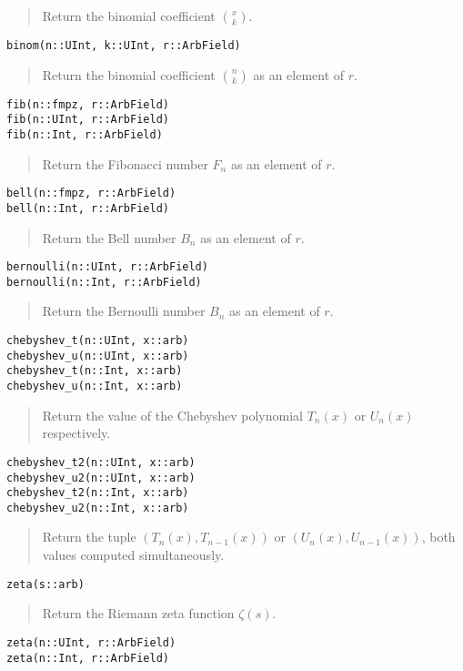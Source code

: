 \documentclass[a4paper,10pt]{article}
\newcommand{\desc}[1]{\vspace{-3mm}\begin{quote}#1\end{quote}}
\begin{document}
{{\desc{Return the binomial coefficient ${x \choose k}$.}

\begin{lstlisting}
binom(n::UInt, k::UInt, r::ArbField)
\end{lstlisting}

\desc{Return the binomial coefficient ${n \choose k}$ as an element of $r$.}

\begin{lstlisting}
fib(n::fmpz, r::ArbField)
fib(n::UInt, r::ArbField)
fib(n::Int, r::ArbField)
\end{lstlisting}

\desc{Return the Fibonacci number $F_n$ as an element of $r$.}

\begin{lstlisting}
bell(n::fmpz, r::ArbField)
bell(n::Int, r::ArbField)
\end{lstlisting}

\desc{Return the Bell number $B_n$ as an element of $r$.}

\begin{lstlisting}
bernoulli(n::UInt, r::ArbField)
bernoulli(n::Int, r::ArbField)
\end{lstlisting}

\desc{Return the Bernoulli number $B_n$ as an element of $r$.}

\begin{lstlisting}
chebyshev_t(n::UInt, x::arb)
chebyshev_u(n::UInt, x::arb)
chebyshev_t(n::Int, x::arb)
chebyshev_u(n::Int, x::arb)
\end{lstlisting}

\desc{Return the value of the Chebyshev polynomial $T_n(x)$ or $U_n(x)$ respectively.}

\begin{lstlisting}
chebyshev_t2(n::UInt, x::arb)
chebyshev_u2(n::UInt, x::arb)
chebyshev_t2(n::Int, x::arb)
chebyshev_u2(n::Int, x::arb)
\end{lstlisting}

\desc{Return the tuple $(T_{n}(x), T_{n-1}(x))$ or $(U_{n}(x), U_{n-1}(x))$,
both values computed simultaneously.}

\begin{lstlisting}
zeta(s::arb)
\end{lstlisting}

\desc{Return the Riemann zeta function $\zeta(s)$.}

\begin{lstlisting}
zeta(n::UInt, r::ArbField)
zeta(n::Int, r::ArbField)
\end{lstlisting}

}}
\end{document}
